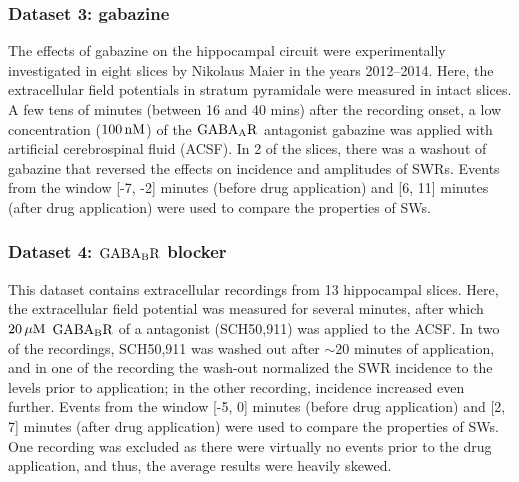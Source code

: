     \subsubsection{Dataset 3: gabazine}
      The effects of gabazine on the hippocampal circuit were experimentally
      investigated in eight slices by Nikolaus Maier in the years 2012--2014.
      Here, the extracellular field potentials in stratum pyramidale were
      measured in intact slices. A few tens of minutes (between 16 and 40 mins)
      after the recording onset, a low concentration ($100\,\rm nM$) of the
      $\rm GABA_AR$ antagonist gabazine was applied with artificial
      cerebrospinal fluid (ACSF). In 2 of the slices, there was a washout of
      gabazine that reversed the effects on incidence and amplitudes of SWRs.
      Events from the window [-7, -2] minutes (before drug application) and [6,
      11] minutes (after drug application) were used to compare the properties
      of SWs.
      
    \subsubsection{Dataset 4: $\rm GABA_B R$ blocker}
      This dataset contains extracellular recordings from 13 hippocampal slices. Here, the
      extracellular field potential was measured for several minutes, after which $20\, \rm \mu M$ ${\rm GABA_BR}$ of a antagonist
      (SCH50,911) was applied to the ACSF. In two of the recordings,
      SCH50,911 was washed out after $\sim 20$ minutes of application, and in
      one of the recording the wash-out normalized the SWR incidence to the
      levels prior to application; in the other recording, incidence increased
      even further.  Events from the window [-5, 0] minutes (before drug
      application) and [2, 7] minutes (after drug application) were used to
      compare the properties of SWs. One recording was excluded as there were
      virtually no events prior to the drug application, and thus, the average
      results were heavily skewed. 

